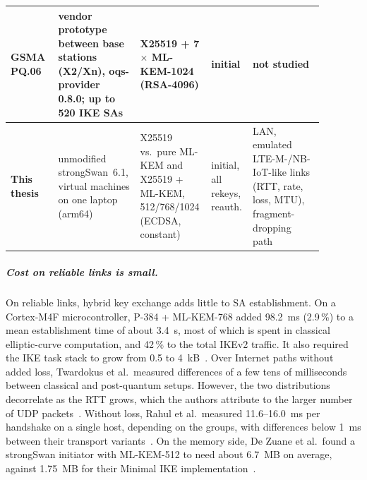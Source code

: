 \begin{table}[!h]
\begin{tabular}{| p{0.14\linewidth} | p{0.21\linewidth} | p{0.22\linewidth} | p{0.09\linewidth} | p{0.22\linewidth} |}
        GSMA PQ.06~\cite{gsmaPq06}
            & vendor prototype between base stations (X2/Xn), oqs-provider 0.8.0; up to 520 IKE SAs
            & X25519 + 7 $\times$ ML-KEM-1024 (RSA-4096)
            & initial
            & not studied \\ \hline\hline
        \textbf{This thesis}
            & unmodified strongSwan~6.1, virtual machines on one laptop (arm64)
            & X25519 vs.\ pure ML-KEM and X25519 + ML-KEM, 512/768/1024 (ECDSA, constant)
            & initial, all rekeys, reauth.
            & LAN, emulated LTE-M-/NB-IoT-like links (RTT, rate, loss, MTU), fragment-dropping path \\ \hline
    \end{tabular}
\end{table}

\subparagraph{Cost on reliable links is small.}
On reliable links, hybrid key exchange adds little to SA establishment.
On a Cortex-M4F microcontroller, P-384 + ML-KEM-768 added 98.2~ms (2.9\,\%) to
a mean establishment time of about 3.4~s, most of which is spent in
classical elliptic-curve computation, and 42\,\% to the total IKEv2 traffic. It also required the IKE task
stack to grow from 0.5 to 4~kB~\cite{bahaaeldin2026}. Over Internet paths without
added loss, Twardokus et al.\ measured differences of a few tens of
milliseconds between classical and post-quantum setups. However, the two
distributions decorrelate as the RTT grows, which the authors attribute to the
larger number of UDP packets~\cite{twardokus2025}. Without loss, Rahul et al.\
measured 11.6--16.0~ms per handshake on a single host, depending on the groups,
with differences below 1~ms between their transport variants~\cite{rahul2026}. On the memory side, De Zuane et al.\ found
a strongSwan initiator with ML-KEM-512 to need about 6.7~MB on average, against
1.75~MB for their Minimal IKE implementation~\cite{dezuane2026}.

